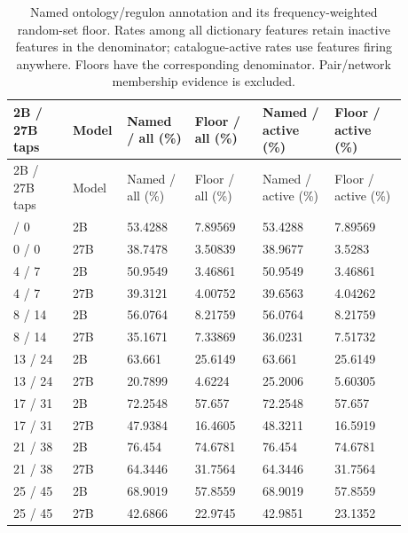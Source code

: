 \begin{longtable}{@{}L{0.14\linewidth}L{0.08\linewidth}L{0.16\linewidth}L{0.16\linewidth}L{0.17\linewidth}L{0.17\linewidth}@{}}
\caption{Named ontology/regulon annotation and its frequency-weighted random-set floor. Rates among all dictionary features retain inactive features in the denominator; catalogue-active rates use features firing anywhere. Floors have the corresponding denominator. Pair/network membership evidence is excluded.}\\
\toprule
2B / 27B taps & Model & Named / all (\%) & Floor / all (\%) & Named / active (\%) & Floor / active (\%) \\
\midrule
\endfirsthead
\toprule
2B / 27B taps & Model & Named / all (\%) & Floor / all (\%) & Named / active (\%) & Floor / active (\%) \\
\midrule
\endhead
\endfoot
\bottomrule
{} / 0 & 2B & 53.4288 & 7.89569 & 53.4288 & 7.89569 \\
0 / 0 & 27B & 38.7478 & 3.50839 & 38.9677 & 3.5283 \\
4 / 7 & 2B & 50.9549 & 3.46861 & 50.9549 & 3.46861 \\
4 / 7 & 27B & 39.3121 & 4.00752 & 39.6563 & 4.04262 \\
8 / 14 & 2B & 56.0764 & 8.21759 & 56.0764 & 8.21759 \\
8 / 14 & 27B & 35.1671 & 7.33869 & 36.0231 & 7.51732 \\
13 / 24 & 2B & 63.661 & 25.6149 & 63.661 & 25.6149 \\
13 / 24 & 27B & 20.7899 & 4.6224 & 25.2006 & 5.60305 \\
17 / 31 & 2B & 72.2548 & 57.657 & 72.2548 & 57.657 \\
17 / 31 & 27B & 47.9384 & 16.4605 & 48.3211 & 16.5919 \\
21 / 38 & 2B & 76.454 & 74.6781 & 76.454 & 74.6781 \\
21 / 38 & 27B & 64.3446 & 31.7564 & 64.3446 & 31.7564 \\
25 / 45 & 2B & 68.9019 & 57.8559 & 68.9019 & 57.8559 \\
25 / 45 & 27B & 42.6866 & 22.9745 & 42.9851 & 23.1352 \\
\end{longtable}
